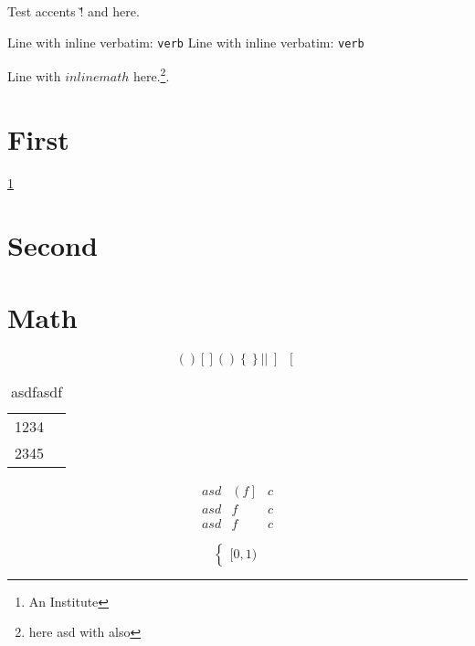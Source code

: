 \documentclass{article}
\begin{document}
Test accents \v! and \v@ here.

Line with inline verbatim: \verb+verb+
Line with inline verbatim: \verb*+verb+

Line with $inline math$ here.\footnote{here {asd} with \cmd also}.

\section{First}
\label{sec:first}

\ref{sec:first}
\pageref{sec:second}
\nocite{bibkey0}
\cite{bibkey1}
\citet*{bibkey2}
\citep{bibkey3}
\citep[e.g.][]{bibkey4}

\section{Second}
\label{sec:second}

\author{A. Author\thanks{An Institute}}

\section{Math}
\label{sec:math}

\begin{equation}
  ( )
  [ ]

  \left( \right)
  \left\{ \right\}
  \left\lvert \right\rvert
  \left] \right[
\end{equation}

\begin{table}
  \centering
  \caption{asdfasdf}
  \label{tab:}
  \begin{tabular}{cr}
    1234 \\
    2345 \\
  \end{tabular}
\end{table}

\begin{equation}
  \begin{array}{ccc}
    asd & \left( f \right] & c \\
    asd & f & c \\
    asd & f & c
  \end{array}
\end{equation}

\begin{equation}
  \begin{cases}
    [0,1)
  \end{cases}
\end{equation}
\end{document}
